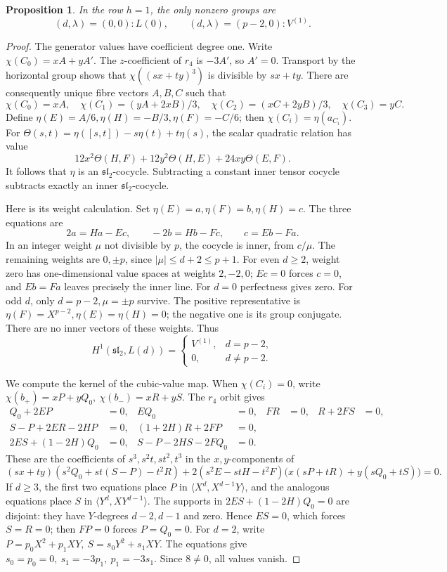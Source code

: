 \documentclass[11pt]{article}
\theoremstyle{plain}
\newtheorem{proposition}[proposition]{Proposition}
\theoremstyle{definition}
\theoremstyle{remark}
\numberwithin{equation}{section}
\begin{document}
\begin{proposition}\label{prop:h1-classification}
In the row \(h=1\), the only nonzero groups are
\[
 (d,\lambda)=(0,0):L(0),\qquad
 (d,\lambda)=(p-2,0):V^{(1)} .
\]
\end{proposition}
\begin{proof}
The generator values have coefficient degree one.
Write \(\chi(C_0)=xA+yA'\).
The \(z\)-coefficient of \(r_4\) is \(-3A'\), so \(A'=0\).
Transport by the horizontal group shows that
\(\chi((sx+ty)^3)\) is divisible by \(sx+ty\).
There are consequently unique fibre vectors \(A,B,C\) such that
\[
 \chi(C_0)=xA,\quad \chi(C_1)=(yA+2xB)/3,\quad
 \chi(C_2)=(xC+2yB)/3,\quad \chi(C_3)=yC .
\]
Define \(\eta(E)=A/6,\eta(H)=-B/3,\eta(F)=-C/6\);
then \(\chi(C_i)=\eta(a_{C_i})\).
For
\(\Theta(s,t)=\eta([s,t])-s\eta(t)+t\eta(s)\),
the scalar quadratic relation has value
\[
 12x^2\Theta(H,F)+12y^2\Theta(H,E)+24xy\Theta(E,F).
\]
It follows that \(\eta\) is an \(\mathfrak{sl}_2\)-cocycle.
Subtracting a constant inner tensor cocycle subtracts exactly
an inner \(\mathfrak{sl}_2\)-cocycle.

Here is its weight calculation.
Set \(\eta(E)=a,\eta(F)=b,\eta(H)=c\).
The three equations are
\[
 2a=Ha-Ec,\qquad -2b=Hb-Fc,\qquad c=Eb-Fa.
\]
In an integer weight \(\mu\) not divisible by \(p\), the cocycle
is inner, from \(c/\mu\).
The remaining weights are \(0,\pm p\), since
\(|\mu|\le d+2\le p+1\).
For even \(d\ge2\), weight zero has one-dimensional value spaces
at weights \(2,-2,0\); \(Ec=0\) forces \(c=0\), and
\(Eb=Fa\) leaves precisely the inner line.
For \(d=0\) perfectness gives zero.
For odd \(d\), only \(d=p-2,\mu=\pm p\) survive.
The positive representative is
\(\eta(F)=X^{p-2},\eta(E)=\eta(H)=0\);
the negative one is its group conjugate. There are no inner
vectors of these weights. Thus
\[
 H^1(\mathfrak{sl}_2,L(d))=
 \begin{cases}V^{(1)},&d=p-2,\\0,&d\ne p-2.\end{cases}
\]

We compute the kernel of the cubic-value map.
When \(\chi(C_i)=0\), write
\(\chi(b_+)=xP+yQ_0,\ \chi(b_-)=xR+yS\).
The \(r_4\) orbit gives
\begin{align*}
 Q_0+2EP&=0,&EQ_0&=0,&FR&=0,&R+2FS&=0,\\
 S-P+2ER-2HP&=0,&
 (1+2H)R+2FP&=0,\\
 2ES+(1-2H)Q_0&=0,&
 S-P-2HS-2FQ_0&=0 .
\end{align*}
These are the coefficients of \(s^3,s^2t,st^2,t^3\)
in the \(x,y\)-components of
\[
 (sx+ty)(s^2Q_0+st(S-P)-t^2R)
 +2(s^2E-stH-t^2F)
       \bigl(x(sP+tR)+y(sQ_0+tS)\bigr)=0 .
\]
If \(d\ge3\), the first two equations place \(P\) in
\(\langle X^d,X^{d-1}Y\rangle\), and the analogous equations place
\(S\) in \(\langle Y^d,XY^{d-1}\rangle\).
The supports in \(2ES+(1-2H)Q_0=0\) are disjoint:
they have \(Y\)-degrees \(d-2,d-1\) and zero.
Hence \(ES=0\), which forces \(S=R=0\);
then \(FP=0\) forces \(P=Q_0=0\).
For \(d=2\), write
\(P=p_0X^2+p_1XY,\ S=s_0Y^2+s_1XY\).
The equations give \(s_0=p_0=0,\ s_1=-3p_1,\ p_1=-3s_1\).
Since \(8\ne0\), all values vanish.


\end{proof}
\end{document}
